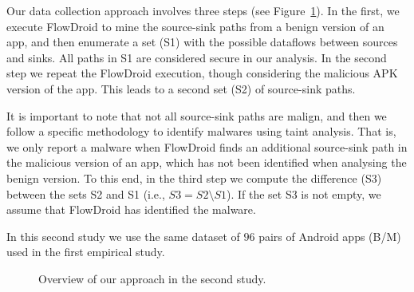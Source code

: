 Our data collection approach involves three steps (see Figure~\ref{fig:settings2}). In the first, we execute FlowDroid to mine the source-sink paths from a benign version of an app, and then enumerate a set (S1) with the 
possible dataflows between sources and sinks. All paths in S1 are considered secure
in our analysis. In the second step we repeat the FlowDroid execution, though
considering the malicious APK version of the app.
This leads to a second set (S2) of source-sink paths.

It is important to note that not all source-sink paths are malign, and then we
follow a specific methodology to identify malwares using taint analysis. That is,
we only report a malware when
FlowDroid finds an additional source-sink path in the malicious version of an app, which
has not been identified when analysing the benign version. To this end, in the third step we compute the difference (S3) between the sets S2 and S1 (i.e., $S3 = S2 \setminus S1$). If the set S3 is not empty, we assume that FlowDroid
has identified the malware.

In this second study we use the same dataset of $96$ pairs of Android apps (B/M) used in the first empirical
study.


\begin{figure}
  \caption{Overview of our approach in the second study.}
  \label{fig:settings2}
\end{figure}


